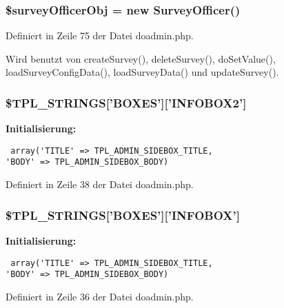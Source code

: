 \subsubsection{\setlength{\rightskip}{0pt plus 5cm}\$surveyOfficerObj = new {\bf SurveyOfficer}()}\label{doadmin_8php_f02bcca2b2722955b3638c8e9d6f1914}




Definiert in Zeile 75 der Datei doadmin.php.

Wird benutzt von createSurvey(), deleteSurvey(), doSetValue(), loadSurveyConfigData(), loadSurveyData() und updateSurvey().
\subsubsection{\setlength{\rightskip}{0pt plus 5cm}\$TPL\_\-STRINGS['BOXES']['INFOBOX2']}\label{doadmin_8php_ab431c722d5f87f8e9a1119ce1634d16}


\textbf{Initialisierung:}

\begin{Code}\begin{verbatim} array('TITLE' => TPL_ADMIN_SIDEBOX_TITLE,
'BODY' => TPL_ADMIN_SIDEBOX_BODY)
\end{verbatim}
\end{Code}


Definiert in Zeile 38 der Datei doadmin.php.
\subsubsection{\setlength{\rightskip}{0pt plus 5cm}\$TPL\_\-STRINGS['BOXES']['INFOBOX']}\label{doadmin_8php_47a202961f8da5800fabe9734b097d1e}


\textbf{Initialisierung:}

\begin{Code}\begin{verbatim} array('TITLE' => TPL_ADMIN_SIDEBOX_TITLE,
'BODY' => TPL_ADMIN_SIDEBOX_BODY)
\end{verbatim}
\end{Code}


Definiert in Zeile 36 der Datei doadmin.php.
